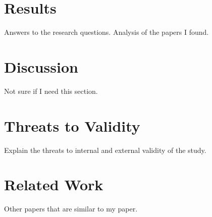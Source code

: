 \section{Results}
Answers to the research questions.
Analysis of the papers I found.

\section{Discussion}
Not sure if I need this section.

\section{Threats to Validity}
Explain the threats to internal and external validity of the study.

\section{Related Work}
Other papers that are similar to my paper.



